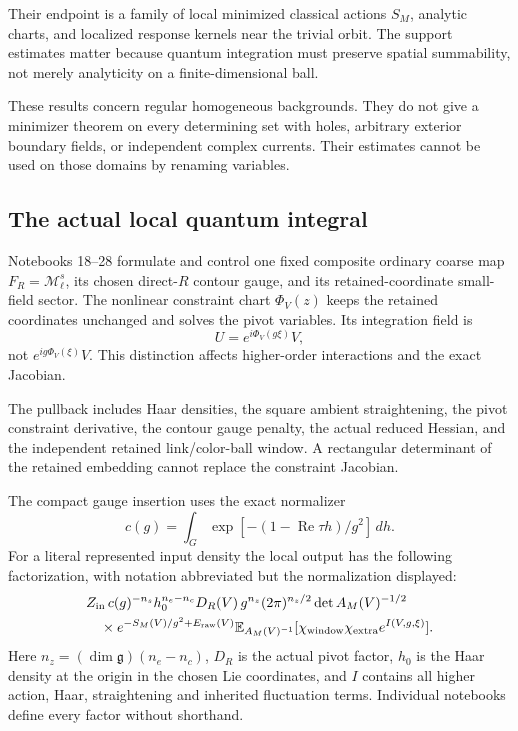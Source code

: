 \documentclass[11pt]{article}
\theoremstyle{remark}
\begin{document}
Their endpoint is a family of local minimized classical actions
\(S_M\), analytic charts, and localized response kernels near
the trivial orbit. The support estimates matter because quantum
integration must preserve spatial summability, not merely
analyticity on a finite-dimensional ball.

These results concern regular homogeneous backgrounds. They do
not give a minimizer theorem on every determining set with
holes, arbitrary exterior boundary fields, or independent
complex currents. Their estimates cannot be used on those
domains by renaming variables.

\subsection{The actual local quantum integral}

Notebooks 18--28 formulate and control one fixed composite
ordinary coarse map \(F_R=\mathcal M_\ell^s\), its chosen
direct-\(R\) contour gauge, and its retained-coordinate
small-field sector. The nonlinear constraint chart
\(\Phi_V(z)\) keeps the retained coordinates unchanged and
solves the pivot variables. Its integration field is
\[
                 U=e^{i\Phi_V(g\xi)}V,
\]
not \(e^{ig\Phi_V(\xi)}V\). This distinction affects
higher-order interactions and the exact Jacobian.

The pullback includes Haar densities, the square ambient
straightening, the pivot constraint derivative, the contour
gauge penalty, the actual reduced Hessian, and the independent
retained link/color-ball window. A rectangular determinant of
the retained embedding cannot replace the constraint Jacobian.

The compact gauge insertion uses the exact normalizer
\[
 c(g)=\int_G\exp[-(1-\operatorname{Re}\tau h)/g^2]\,dh.
\]
For a literal represented input density the local output
has the following factorization, with notation abbreviated
but the normalization displayed:
\begin{align*}
 &Z_{\rm in}\,c(g)^{-n_s}h_0^{n_e-n_c}D_R(V)\,
 g^{n_z}(2\pi)^{n_z/2}\det A_M(V)^{-1/2}\\
 &\quad{}\times e^{-S_M(V)/g^2+E_{\rm raw}(V)}
 \mathbb E_{A_M(V)^{-1}}
       [\chi_{\rm window}\chi_{\rm extra}e^{I(V,g,\xi)}].
\end{align*}
Here \(n_z=(\dim\mathfrak g)(n_e-n_c)\), \(D_R\) is the
actual pivot factor, \(h_0\) is the Haar density at the origin
in the chosen Lie coordinates, and \(I\) contains all higher
action, Haar, straightening and inherited fluctuation terms.
Individual notebooks define every factor without shorthand.
\end{document}
